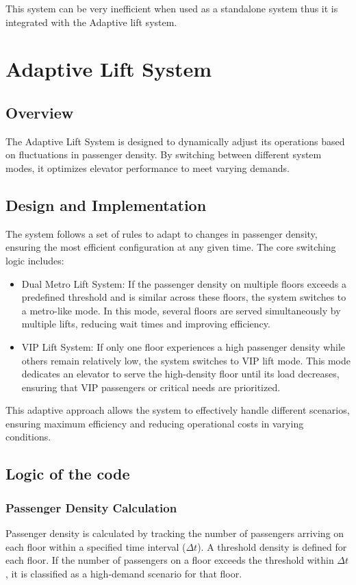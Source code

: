 \documentclass[12pt,a4paper]{report}
\begin{document}
This system can be very inefficient when used as a standalone system thus it is integrated with the Adaptive lift system.

\chapter{Adaptive Lift System}
\section{Overview}
The Adaptive Lift System is designed to dynamically adjust its operations based on fluctuations in passenger density. By switching between different system modes, it optimizes elevator performance to meet varying demands.

\section{Design and Implementation}
The system follows a set of rules to adapt to changes in passenger density, ensuring the most efficient configuration at any given time. The core switching logic includes:
\begin{itemize}
    \item Dual Metro Lift System: If the passenger density on multiple floors exceeds a predefined threshold and is similar across these floors, the system switches to a metro-like mode. In this mode, several floors are served simultaneously by multiple lifts, reducing wait times and improving efficiency.
    \item VIP Lift System: If only one floor experiences a high passenger density while others remain relatively low, the system switches to VIP lift mode. This mode dedicates an elevator to serve the high-density floor until its load decreases, ensuring that VIP passengers or critical needs are prioritized.
\end{itemize}
This adaptive approach allows the system to effectively handle different scenarios, ensuring maximum efficiency and reducing operational costs in varying conditions.

\section{Logic of the code}
\subsection{Passenger Density Calculation}
Passenger density is calculated by tracking the number of passengers arriving on each floor within a specified time interval (\(\Delta t\)). A threshold density is defined for each floor. If the number of passengers on a floor exceeds the threshold within \(\Delta t\), it is classified as a high-demand scenario for that floor.
\end{document}
